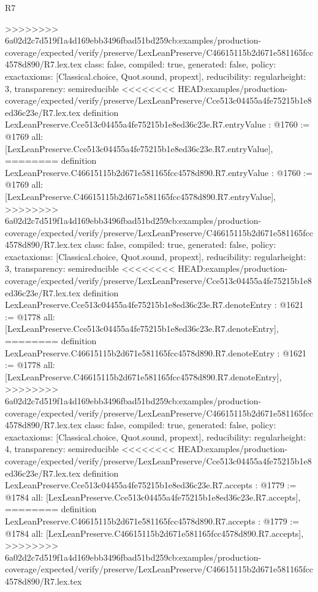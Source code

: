 \begin{lexlean}{R7}
\begin{coremodule}
{{{{{{{{{{{{{{{>>>>>>>> 6a02d2c7d519f1a4d169ebb3496fbad51bd259cb:examples/production-coverage/expected/verify/preserve/LexLeanPreserve/C46615115b2d671e581165fcc4578d890/R7.lex.tex
  class: false,
  compiled: true,
  generated: false,
  policy: exact{axioms: [Classical.choice, Quot.sound, propext]},
  reducibility: regular{height: 3},
  transparency: semireducible
}
<<<<<<<< HEAD:examples/production-coverage/expected/verify/preserve/LexLeanPreserve/Cce513c04455a4fe75215b1e8ed36c23e/R7.lex.tex
definition LexLeanPreserve.Cce513c04455a4fe75215b1e8ed36c23e.R7.entryValue : @1760 := @1769 {
  all: [LexLeanPreserve.Cce513c04455a4fe75215b1e8ed36c23e.R7.entryValue],
========
definition LexLeanPreserve.C46615115b2d671e581165fcc4578d890.R7.entryValue : @1760 := @1769 {
  all: [LexLeanPreserve.C46615115b2d671e581165fcc4578d890.R7.entryValue],
>>>>>>>> 6a02d2c7d519f1a4d169ebb3496fbad51bd259cb:examples/production-coverage/expected/verify/preserve/LexLeanPreserve/C46615115b2d671e581165fcc4578d890/R7.lex.tex
  class: false,
  compiled: true,
  generated: false,
  policy: exact{axioms: [Classical.choice, Quot.sound, propext]},
  reducibility: regular{height: 3},
  transparency: semireducible
}
<<<<<<<< HEAD:examples/production-coverage/expected/verify/preserve/LexLeanPreserve/Cce513c04455a4fe75215b1e8ed36c23e/R7.lex.tex
definition LexLeanPreserve.Cce513c04455a4fe75215b1e8ed36c23e.R7.denoteEntry : @1621 := @1778 {
  all: [LexLeanPreserve.Cce513c04455a4fe75215b1e8ed36c23e.R7.denoteEntry],
========
definition LexLeanPreserve.C46615115b2d671e581165fcc4578d890.R7.denoteEntry : @1621 := @1778 {
  all: [LexLeanPreserve.C46615115b2d671e581165fcc4578d890.R7.denoteEntry],
>>>>>>>> 6a02d2c7d519f1a4d169ebb3496fbad51bd259cb:examples/production-coverage/expected/verify/preserve/LexLeanPreserve/C46615115b2d671e581165fcc4578d890/R7.lex.tex
  class: false,
  compiled: true,
  generated: false,
  policy: exact{axioms: [Classical.choice, Quot.sound, propext]},
  reducibility: regular{height: 4},
  transparency: semireducible
}
<<<<<<<< HEAD:examples/production-coverage/expected/verify/preserve/LexLeanPreserve/Cce513c04455a4fe75215b1e8ed36c23e/R7.lex.tex
definition LexLeanPreserve.Cce513c04455a4fe75215b1e8ed36c23e.R7.accepts : @1779 := @1784 {
  all: [LexLeanPreserve.Cce513c04455a4fe75215b1e8ed36c23e.R7.accepts],
========
definition LexLeanPreserve.C46615115b2d671e581165fcc4578d890.R7.accepts : @1779 := @1784 {
  all: [LexLeanPreserve.C46615115b2d671e581165fcc4578d890.R7.accepts],
>>>>>>>> 6a02d2c7d519f1a4d169ebb3496fbad51bd259cb:examples/production-coverage/expected/verify/preserve/LexLeanPreserve/C46615115b2d671e581165fcc4578d890/R7.lex.tex
}}}}}}}}}}}}}}}}}}
\end{coremodule}
\end{lexlean}
